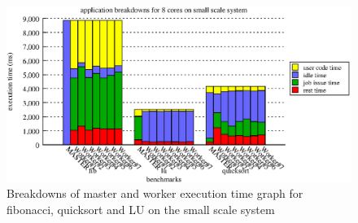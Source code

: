 \begin{figure}[!ht]
\includegraphics[width=\columnwidth]{figures/app_breakdowns_minititan}
\caption{Breakdowns of master and worker execution time graph for fibonacci, quicksort and LU on the small scale system}
\label{fig:app_breakdowns_minititan}
\end{figure}



